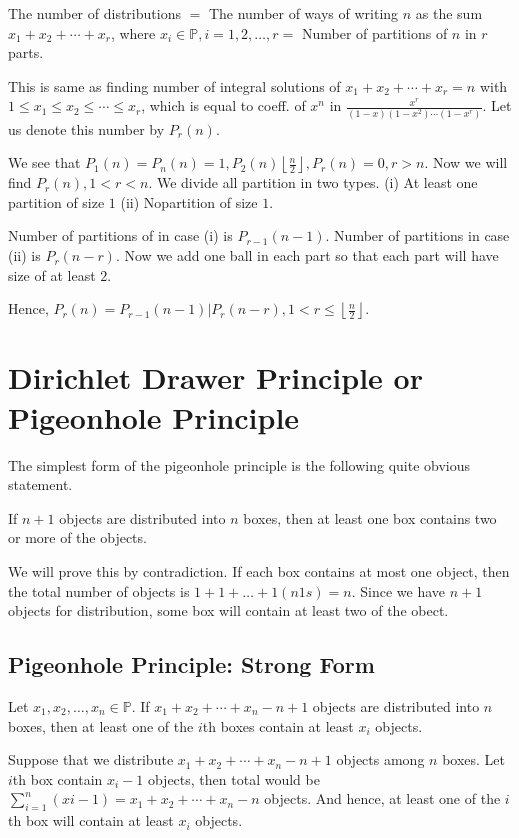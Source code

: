 The number of distributions $=$ The number of ways of writing $n$ as the sum $x_1 + x_2 + \cdots + x_r$,
where $x_i\in\mathbb{P}, i = 1, 2, \ldots, r =$ Number of partitions of $n$ in $r$ parts.

This is same as finding number of integral solutions of $x_1 + x_2 + \cdots + x_r = n$ with $1\leq x_1\leq
x_2\leq \cdots \leq x_r$, which is equal to coeff. of $x^n$ in $\frac{x^r}{(1 - x)(1 - x^2)\cdots(1 -
  x^r)}$. Let us denote this number by $P_r(n)$.

We see that $P_1(n) = P_n(n) = 1, P_2(n) \left\lfloor \frac{n}{2}\right\rfloor, P_r(n) = 0, r > n$. Now we
will find $P_r(n), 1< r < n$. We divide all partition in two types. (i) At least one partition of size $1$
(ii) Nopartition of size $1$.

Number of partitions of in case (i) is $P_{r - 1}(n - 1)$. Number of partitions in case (ii) is $P_r(n -
r)$. Now we add one ball in each part so that each part will have size of at least $2$.

Hence, $P_r(n) = P_{r - 1}(n - 1) | P_r(n - r), 1 < r\leq \left\lfloor \frac{n}{2}\right\rfloor$.

\section{Dirichlet Drawer Principle or Pigeonhole Principle}
The simplest form of the pigeonhole principle is the following quite obvious statement.

\starttheorem
  If $n + 1$ objects are distributed into $n$ boxes, then at least one box contains two or more of the objects.
\stoptheorem

\startproof
  We will prove this by contradiction. If each box contains at most one object, then the total number of
  objects is $1 + 1 + \ldots + 1(n 1s) = n$. Since we have $n + 1$ objects for distribution, some box will
  contain at least two of the obect.
\stopproof

\subsection{Pigeonhole Principle: Strong Form}
\starttheorem
  Let $x_1, x_2, \ldots, x_n\in\mathbb{P}$. If $x_1+ x_2 + \cdots + x_n - n + 1$ objects are distributed
  into $n$ boxes, then at least one of the $i$th boxes contain at least $x_i$ objects.
\stoptheorem

\startproof
  Suppose that we distribute $x_1 + x_2 + \cdots + x_n - n + 1$ objects among $n$ boxes. Let $i$th box
  contain $x_i - 1$ objects, then total would be $\displaystyle\sum_{i=1}^n(xi - 1) = x_1 + x_2 + \cdots +
  x_n - n$ objects. And hence, at least one of the $i$th box will contain at least $x_i$ objects.
\stopproof
\pagebreak
